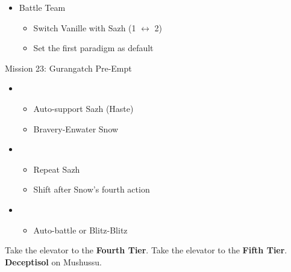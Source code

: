 \begin{multicols}{2}
  \begin{menu}
    \begin{itemize}
      \paradigm
      \begin{itemize}
        \item Battle Team
              \begin{itemize}
                \item Switch Vanille with Sazh (1 $\leftrightarrow$ 2)
                \item Set the first paradigm as default
              \end{itemize}
      \end{itemize}
    \end{itemize}
  \end{menu}
  \vfill
  \begin{battle}{Mission 23: Gurangatch Pre-Empt}
    \begin{itemize}
      \item \first
            \begin{itemize}
              \item Auto-support Sazh (Haste)
              \item Bravery-Enwater Snow
            \end{itemize}
      \item \fifth
            \begin{itemize}
              \item Repeat Sazh
              \item Shift after Snow's fourth action
            \end{itemize}
      \item \sixth
            \begin{itemize}
              \item Auto-battle or Blitz-Blitz
            \end{itemize}
    \end{itemize}
  \end{battle}

  Take the elevator to the \textbf{Fourth Tier}.
  Take the elevator to the \textbf{Fifth Tier}.
  \textbf{Deceptisol} on Mushussu.


\end{multicols}
